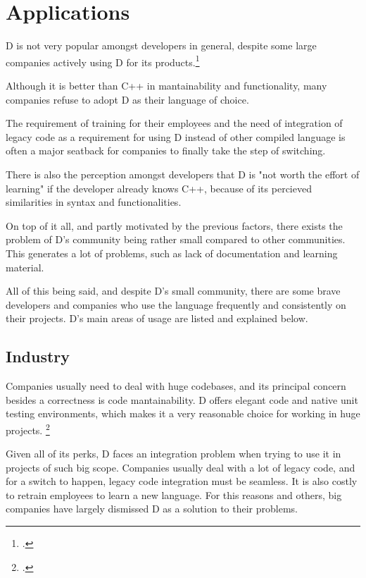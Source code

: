 \section{Applications} \label{sec:applications}

D is not very popular amongst developers in general, despite some large companies actively using D for its products.\footcite{orgs_using_d}

Although it is better than C++ in mantainability and functionality, many companies refuse to adopt D as their language of choice.

The requirement of training for their employees and the need of integration of legacy code as a requirement for using D instead of other compiled language is often a major seatback for companies to finally take the step of switching.

There is also the perception amongst developers that D is "not worth the effort of learning" if the developer already knows C++, because of its percieved similarities in syntax and functionalities.

On top of it all, and partly motivated by the previous factors, there exists the problem of D's community being rather small compared to other communities. This generates a lot of problems, such as lack of documentation and learning material.

All of this being said, and despite D's small community, there are some brave developers and companies who use the language frequently and consistently on their projects. D's main areas of usage are listed and explained below.

\subsection{Industry}

Companies usually need to deal with huge codebases, and its principal concern besides a correctness is code mantainability. D offers elegant code and native unit testing environments, which makes it a very reasonable choice for working in huge projects. \footcite{areas_of_d_usage}

Given all of its perks, D faces an integration problem when trying to use it in projects of such big scope. Companies usually deal with a lot of legacy code, and for a switch to happen, legacy code integration must be seamless. It is also costly to retrain employees to learn a new language. For this reasons and others, big companies have largely dismissed D as a solution to their problems.

